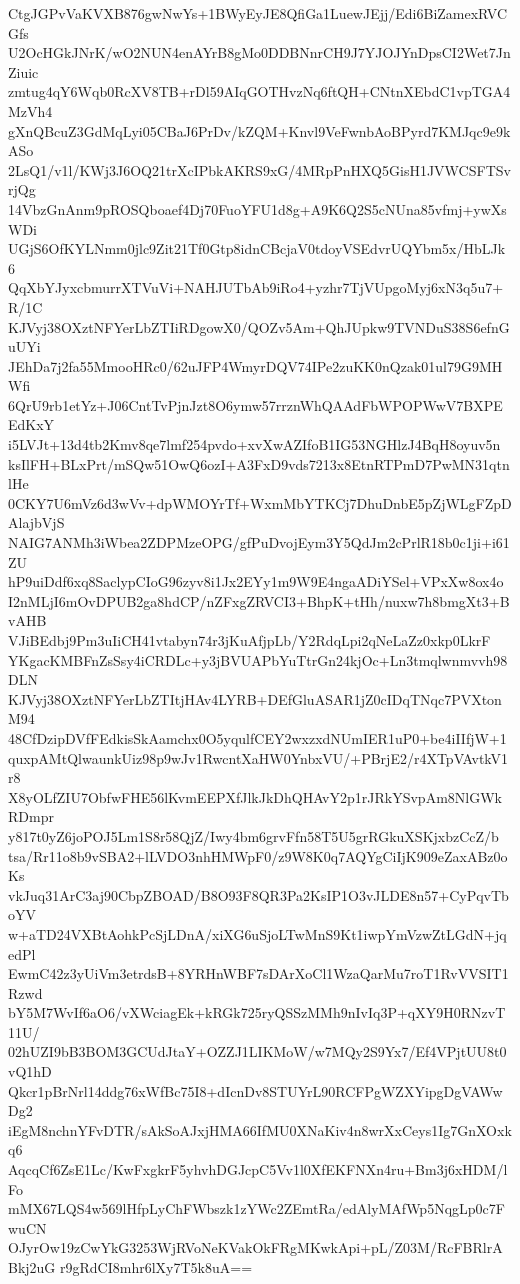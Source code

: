 CtgJGPvVaKVXB876gwNwYs+1BWyEyJE8QfiGa1LuewJEjj/Edi6BiZamexRVCGfs
U2OcHGkJNrK/wO2NUN4enAYrB8gMo0DDBNnrCH9J7YJOJYnDpsCI2Wet7JnZiuic
zmtug4qY6Wqb0RcXV8TB+rDl59AIqGOTHvzNq6ftQH+CNtnXEbdC1vpTGA4MzVh4
gXnQBcuZ3GdMqLyi05CBaJ6PrDv/kZQM+Knvl9VeFwnbAoBPyrd7KMJqc9e9kASo
2LsQ1/v1l/KWj3J6OQ21trXcIPbkAKRS9xG/4MRpPnHXQ5GisH1JVWCSFTSvrjQg
14VbzGnAnm9pROSQboaef4Dj70FuoYFU1d8g+A9K6Q2S5cNUna85vfmj+ywXsWDi
UGjS6OfKYLNmm0jlc9Zit21Tf0Gtp8idnCBcjaV0tdoyVSEdvrUQYbm5x/HbLJk6
QqXbYJyxcbmurrXTVuVi+NAHJUTbAb9iRo4+yzhr7TjVUpgoMyj6xN3q5u7+R/1C
KJVyj38OXztNFYerLbZTIiRDgowX0/QOZv5Am+QhJUpkw9TVNDuS38S6efnGuUYi
JEhDa7j2fa55MmooHRc0/62uJFP4WmyrDQV74IPe2zuKK0nQzak01ul79G9MHWfi
6QrU9rb1etYz+J06CntTvPjnJzt8O6ymw57rrznWhQAAdFbWPOPWwV7BXPEEdKxY
i5LVJt+13d4tb2Kmv8qe7lmf254pvdo+xvXwAZIfoB1IG53NGHlzJ4BqH8oyuv5n
ksIlFH+BLxPrt/mSQw51OwQ6ozI+A3FxD9vds7213x8EtnRTPmD7PwMN31qtnlHe
0CKY7U6mVz6d3wVv+dpWMOYrTf+WxmMbYTKCj7DhuDnbE5pZjWLgFZpDAlajbVjS
NAIG7ANMh3iWbea2ZDPMzeOPG/gfPuDvojEym3Y5QdJm2cPrlR18b0c1ji+i61ZU
hP9uiDdf6xq8SaclypCIoG96zyv8i1Jx2EYy1m9W9E4ngaADiYSel+VPxXw8ox4o
I2nMLjI6mOvDPUB2ga8hdCP/nZFxgZRVCI3+BhpK+tHh/nuxw7h8bmgXt3+BvAHB
VJiBEdbj9Pm3uIiCH41vtabyn74r3jKuAfjpLb/Y2RdqLpi2qNeLaZz0xkp0LkrF
YKgacKMBFnZsSsy4iCRDLc+y3jBVUAPbYuTtrGn24kjOc+Ln3tmqlwnmvvh98DLN
KJVyj38OXztNFYerLbZTItjHAv4LYRB+DEfGluASAR1jZ0cIDqTNqc7PVXtonM94
48CfDzipDVfFEdkisSkAamchx0O5yqulfCEY2wxzxdNUmIER1uP0+be4iIIfjW+1
quxpAMtQlwaunkUiz98p9wJv1RwcntXaHW0YnbxVU/+PBrjE2/r4XTpVAvtkV1r8
X8yOLfZIU7ObfwFHE56lKvmEEPXfJlkJkDhQHAvY2p1rJRkYSvpAm8NlGWkRDmpr
y817t0yZ6joPOJ5Lm1S8r58QjZ/Iwy4bm6grvFfn58T5U5grRGkuXSKjxbzCcZ/b
tsa/Rr11o8b9vSBA2+lLVDO3nhHMWpF0/z9W8K0q7AQYgCiIjK909eZaxABz0oKs
vkJuq31ArC3aj90CbpZBOAD/B8O93F8QR3Pa2KsIP1O3vJLDE8n57+CyPqvTboYV
w+aTD24VXBtAohkPcSjLDnA/xiXG6uSjoLTwMnS9Kt1iwpYmVzwZtLGdN+jqedPl
EwmC42z3yUiVm3etrdsB+8YRHnWBF7sDArXoCl1WzaQarMu7roT1RvVVSIT1Rzwd
bY5M7WvIf6aO6/vXWciagEk+kRGk725ryQSSzMMh9nIvIq3P+qXY9H0RNzvT11U/
02hUZI9bB3BOM3GCUdJtaY+OZZJ1LIKMoW/w7MQy2S9Yx7/Ef4VPjtUU8t0vQ1hD
Qkcr1pBrNrl14ddg76xWfBc75I8+dIcnDv8STUYrL90RCFPgWZXYipgDgVAWwDg2
iEgM8nchnYFvDTR/sAkSoAJxjHMA66IfMU0XNaKiv4n8wrXxCeys1Ig7GnXOxkq6
AqcqCf6ZsE1Lc/KwFxgkrF5yhvhDGJcpC5Vv1l0XfEKFNXn4ru+Bm3j6xHDM/lFo
mMX67LQS4w569lHfpLyChFWbszk1zYWc2ZEmtRa/edAlyMAfWp5NqgLp0c7FwuCN
OJyrOw19zCwYkG3253WjRVoNeKVakOkFRgMKwkApi+pL/Z03M/RcFBRlrABkj2uG
r9gRdCI8mhr6lXy7T5k8uA==
